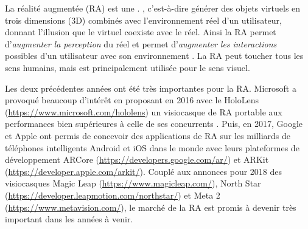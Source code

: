 La réalité augmentée (RA) est une . \citep{OQLFRA2017}, c'est-à-dire générer des objets virtuels en trois dimensions (3D) combinés avec l'environnement réel d'un utilisateur, donnant l'illusion que le virtuel coexiste avec le réel. Ainsi la RA permet d'\emph{augmenter la perception} du réel et permet d'\emph{augmenter les interactions} possibles d'un utilisateur avec son environnement \citep{Azuma1997}. La RA peut toucher tous les sens humains, mais est principalement utilisée pour le sens visuel.


Les deux précédentes années ont été très importantes pour la RA. Microsoft a provoqué beaucoup d'intérêt en proposant en 2016 avec le HoloLens (\url{https://www.microsoft.com/hololens}) un visiocasque de RA portable aux performances bien supérieures à celle de ses concurrents . Puis, en 2017, Google et Apple ont permis de concevoir des applications de RA sur les milliards de téléphones intelligents Android et iOS dans le monde avec leurs plateformes de développement ARCore (\url{https://developers.google.com/ar/}) et ARKit (\url{https://developer.apple.com/arkit/}). Couplé aux annonces pour 2018 des visiocasques Magic Leap (\url{https://www.magicleap.com/}), North Star (\url{https://developer.leapmotion.com/northstar/}) et Meta 2 (\url{https://www.metavision.com/}), le marché de la RA est promis à devenir très important dans les années à venir.


